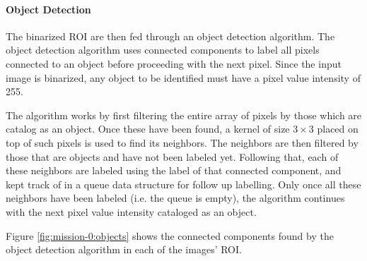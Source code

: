 \paragraph{Object Detection} \label{paragraph:case-study:impl:objects}
The binarized ROI are then fed through an object detection algorithm. The object detection algorithm uses connected components to label all pixels connected to an object before proceeding with the next pixel. Since the input image is binarized, any object to be identified must have a pixel value intensity of 255. 

The algorithm works by first filtering the entire array of pixels by those which are catalog as an object. Once these have been found, a kernel of size $3 \times 3$ placed on top of such pixels is used to find its neighbors. The neighbors are then filtered by those that are objects and have not been labeled yet. Following that, each of these neighbors are labeled using the label of that connected component, and kept track of in a queue data structure for follow up labelling. Only once all these neighbors have been labeled (i.e. the queue is empty), the algorithm continues with the next pixel value intensity cataloged as an object.

Figure \ref{fig:mission-0:objects} shows the connected components found by the object detection algorithm in each of the images' ROI.

